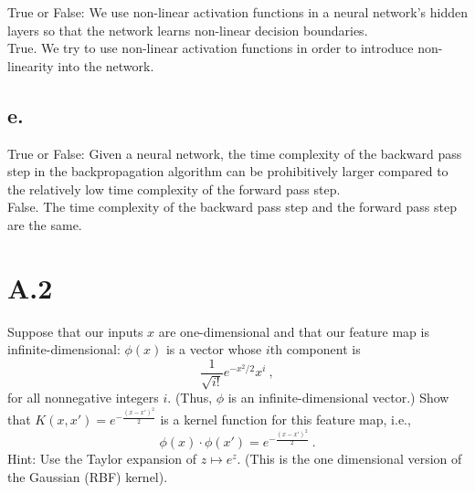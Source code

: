 \documentclass{article}
\newcommand{\1}{\mathbf{1}}
\begin{document}
{True or False: We use non-linear activation functions in a neural network’s hidden layers so that the network learns non-linear decision boundaries. \\

True. We try to use non-linear activation functions in order to introduce non-linearity into the network. 

\subsection*{e.}

True or False: Given a neural network, the time complexity of the backward pass step in the backpropagation algorithm can be prohibitively larger compared to the relatively low time complexity of the forward pass step. \\

False. The time complexity of the backward pass step and the forward pass step are the same. 

}

\section*{A.2}
{\Large


Suppose that our inputs $x$ are one-dimensional and that our feature map is infinite-dimensional: 
$\phi( x) $ is a vector whose $i$th component is \\
\[
    \frac{1}{\sqrt{i!}} e^{-x^2/2}x^i\ ,
\]
for all nonnegative integers $i$. (Thus, $\phi$ is an infinite-dimensional vector.)
Show that $K(x, x') = e^{-\frac{(x-x')^2}{2}}$ is a kernel function for this feature map, i.e., \\
\[
    \phi (x) \cdot \phi (x') = e^{-\frac{(x-x')^2}{2}}\ .
\]
Hint: Use the Taylor expansion of $z \mapsto e^z$.
(This is the one dimensional version of the Gaussian  (RBF) kernel).\\

}
\end{document}
